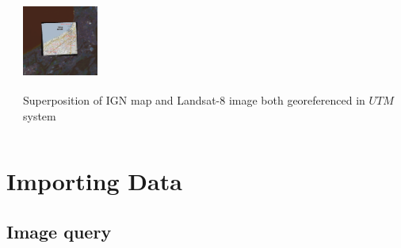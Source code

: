 \documentclass[c]{beamer}
\begin{document}
\begin{frame}
\begin{columns}[t]
\begin{column}{0.30\textwidth}
\end{column}
\begin{column}{0.30\textwidth}
\begin{overlayarea}{\linewidth}{3cm}
  \centering\vfill
  \includegraphics[height=2.5cm,width=2.5cm]{images/georeferencing/qgis-superposition0.png}
\end{overlayarea}
\begin{overlayarea}{\linewidth}{2cm}
  \centering
  \scriptsize Superposition of IGN map and Landsat-8 image both georeferenced in $UTM$ system\par
\end{overlayarea}
\end{column}
\end{columns}

\end{frame}

\section{Importing Data}
\begin{frame}
\tableofcontents[currentsection]
\end{frame}

\subsection{Image query}
\begin{frame}
\tableofcontents[currentsubsection]
\end{frame}
\end{document}
